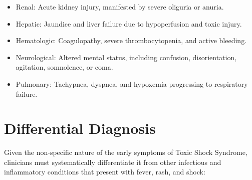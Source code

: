 \begin{itemize}
    \begin{itemize}
        \item Renal: Acute kidney injury, manifested by severe oliguria or anuria.
        \item Hepatic: Jaundice and liver failure due to hypoperfusion and toxic injury.
        \item Hematologic: Coagulopathy, severe thrombocytopenia, and active bleeding.
        \item Neurological: Altered mental status, including confusion, disorientation, agitation, somnolence, or coma.
        \item Pulmonary: Tachypnea, dyspnea, and hypoxemia progressing to respiratory failure.
    \end{itemize}
\end{itemize}

\section*{Differential Diagnosis}
Given the non-specific nature of the early symptoms of Toxic Shock Syndrome, clinicians must systematically differentiate it from other infectious and inflammatory conditions that present with fever, rash, and shock:

